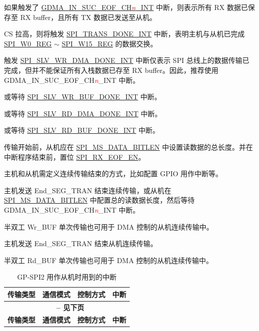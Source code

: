 \documentclass[main\_\_CN.tex]{subfiles}
\begin{document}
\begin{ThreePartTable}

\begin{TableNotes}
    \item[1] 如果触发了 \hyperref[int:GDMAINSUCEOFINT]{GDMA\_IN\_SUC\_EOF\_CH\textcolor{red}{\it{n}}\_INT}  中断，则表示所有 RX 数据已保存至 RX buffer，且所有 TX 数据已发送至从机。
    \item[2] CS 拉高，则将触发  \hyperref[int:SPITRANSDONEINT]{SPI\_TRANS\_DONE\_INT} 中断，表明主机与从机已完成  \hyperref[regdesc:SPIW0REG]{SPI\_W0\_REG} $\sim$ \hyperref[regdesc:SPIW15REG]{SPI\_W15\_REG} 的数据交换。
    \item[3] 触发  \hyperref[int:SPISLVWRDMADONEINT]{SPI\_SLV\_WR\_DMA\_DONE\_INT} 中断仅表示 SPI 总线上的数据传输已完成，但并不能保证所有入栈数据已存至 RX buffer。因此，推荐使用 GDMA\_IN\_SUC\_EOF\_CH\textcolor{red}{\it{n}}\_INT 中断。
    \item[4] 或等待 \hyperref[int:SPISLVWRBUFDONEINT]{SPI\_SLV\_WR\_BUF\_DONE\_INT} 中断。
    \item[5] 或等待 \hyperref[int:SPISLVRDDMADONEINT]{SPI\_SLV\_RD\_DMA\_DONE\_INT} 中断。
    \item[6] 或等待 \hyperref[int:SPISLVRDBUFDONEINT]{SPI\_SLV\_RD\_BUF\_DONE\_INT} 中断。
    \item[7] 传输开始前，从机应在  \hyperref[fielddesc:SPIMSDATABITLEN]{SPI\_MS\_DATA\_BITLEN} 中设置读数据的总长度。并在中断程序结束前，置位 \hyperref[fielddesc:SPIRXEOFEN]{SPI\_RX\_EOF\_EN}。
    \item[8] 主机和从机需定义连续传输结束的方式，比如配置 GPIO 用作中断等。
    \item[9] 主机发送 End\_SEG\_TRAN 结束连续传输，或从机在  \hyperref[fielddesc:SPIMSDATABITLEN]{SPI\_MS\_DATA\_BITLEN} 中配置总的读数据长度，然后等待 GDMA\_IN\_SUC\_EOF\_CH\textcolor{red}{\it{n}}\_INT 中断。
    \item[10] 半双工 Wr\_BUF 单次传输也可用于 DMA 控制的从机连续传输中。
    \item[11] 主机发送 End\_SEG\_TRAN 结束从机连续传输。
    \item[12] 半双工 Rd\_BUF 单次传输也可用于 DMA 控制的从机连续传输中。
\end{TableNotes}
\begin{longtable}[c]{|c|l|l|l|}
\caption{GP-SPI2 用作从机时用到的中断}\label{Table:Slv_Int_Table}
\\
\hline

\rowcolor{lightgray}
\textbf{传输类型 } & \textbf{ 通信模式} & \textbf{ 控制方式} & \textbf{ 中断 } \\\hline
    \endfirsthead
    \multicolumn{4}{c}{\bfseries \tablename\ \thetable{} -- 见下页}\\\hline
    \rowcolor{lightgray}
    \textbf{传输类型 } & \textbf{ 通信模式} & \textbf{ 控制方式} & \textbf{ 中断 }\\\hline
    \endhead


\end{longtable}
\end{ThreePartTable}
\end{document}
